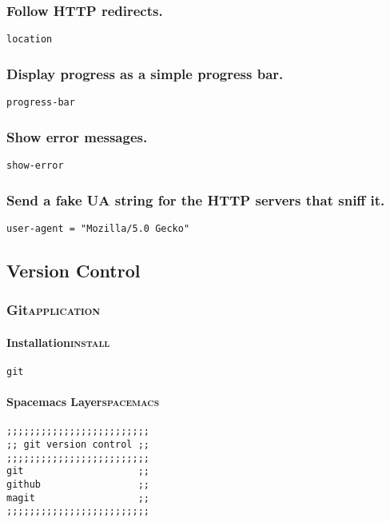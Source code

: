 \documentclass[11pt]{article}
\begin{document}
\subsubsection{Follow HTTP redirects.}
\label{sec:orgac0a6d6}
\begin{verbatim}
location
\end{verbatim}
\subsubsection{Display progress as a simple progress bar.}
\label{sec:org81fcc8e}
\begin{verbatim}
progress-bar
\end{verbatim}
\subsubsection{Show error messages.}
\label{sec:orgce0a202}
\begin{verbatim}
show-error
\end{verbatim}
\subsubsection{Send a fake UA string for the HTTP servers that sniff it.}
\label{sec:org56de04a}
\begin{verbatim}
user-agent = "Mozilla/5.0 Gecko"
\end{verbatim}

\subsection{Version Control}
\label{sec:orgd6148d7}
\subsubsection{Git\hfill{}\textsc{application}}
\label{sec:org21e25cc}
\paragraph{Installation\hfill{}\textsc{install}}
\label{sec:orga6154da}
\begin{verbatim}
git
\end{verbatim}

\paragraph{Spacemacs Layer\hfill{}\textsc{spacemacs}}
\label{sec:org0281edb}
\begin{verbatim}
;;;;;;;;;;;;;;;;;;;;;;;;;
;; git version control ;;
;;;;;;;;;;;;;;;;;;;;;;;;;
git                    ;;
github                 ;;
magit                  ;;
;;;;;;;;;;;;;;;;;;;;;;;;;
\end{verbatim}
\end{document}
